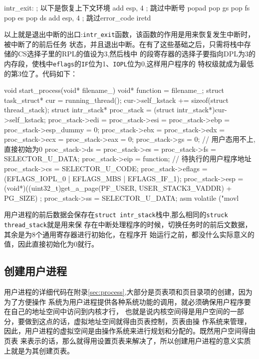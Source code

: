 \begin{codeblock}
\begin{nasmcode}
intr_exit:	     
; 以下是恢复上下文环境
   add esp, 4 ; 跳过中断号
   popad
   pop gs
   pop fs
   pop es
   pop ds
   add esp, 4 ; 跳过error_code
   iretd
\end{nasmcode}  
\end{codeblock}

以上就是退出中断的出口:\texttt{intr\_exit}函数，该函数的作用是用来恢复发生中断时，被中断了的前后任务
状态，并且退出中断。在有了这些基础之后，只需将栈中存储的CS选择子里的RPL的值设为3,然后栈中
的段寄存器的选择子要指向DPL为3的内存段，使栈中\texttt{eflags}的\texttt{IF}位为1、\texttt{IOPL}位为0,这样用户程序的
特权级就成为最低的第3位了。代码如下：
\begin{ccode}
void start_process(void* filename_)
{
   void* function = filename_;
   struct task_struct* cur = running_thread();
   cur->self_kstack += sizeof(struct thread_stack);
   struct intr_stack* proc_stack = (struct intr_stack*)cur->self_kstack;	 
   proc_stack->edi = proc_stack->esi = proc_stack->ebp = proc_stack->esp_dummy = 0;
   proc_stack->ebx = proc_stack->edx = proc_stack->ecx = proc_stack->eax = 0;
   proc_stack->gs = 0;		 // 用户态用不上,直接初始为0
   proc_stack->ds = proc_stack->es = proc_stack->fs = SELECTOR_U_DATA;
   proc_stack->eip = function;	 // 待执行的用户程序地址
   proc_stack->cs = SELECTOR_U_CODE;
   proc_stack->eflags = (EFLAGS_IOPL_0 | EFLAGS_MBS | EFLAGS_IF_1);
   proc_stack->esp = (void*)((uint32_t)get_a_page(PF_USER, USER_STACK3_VADDR) + PG_SIZE) ;
   proc_stack->ss = SELECTOR_U_DATA; 
   asm volatile ("movl %
 }
\end{ccode}
用户进程的前后数据会保存在\texttt{struct intr\_stack}栈中,那么相同的\texttt{struck thread\_stack}就是用来保
存在中断处理程序的时候，切换任务时的前后文数据，其余是为8个通用寄存器进行初始化，在程序开
始运行之前，都没什么实际意义的值，因此直接初始化为0就行。

\subsection{创建用户进程}
用户进程的详细代码在附录\ref{sec:process},大部分是页表项和页目录项的创建，因为为了方便操作
系统为用户进程提供各种系统功能的调用，就必须确保用户程序要在自己的地址空间中访问到内核才行，
也就是说内核空间得是用户空间的一部分，要做到这点的话，虚拟地址空间就得由页表控制，页表由操
作系统来管理，因此，用户进程的虚拟空间是由操作系统来进行规划和分配的。既然用户空间得由页表
来表示的话，那么就得用设置页表来解决了，所以创建用户进程的意义实质上就是为其创建页表。

